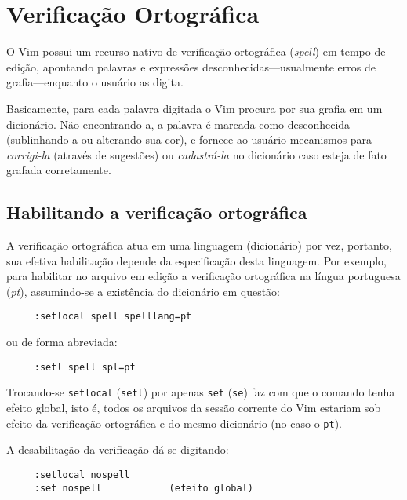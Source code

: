 
\chapter{Verificação Ortográfica}
\label{cha:vero}


O Vim possui um recurso nativo de verificação ortográfica ({\em spell}) em
tempo de edição, apontando palavras e expressões desconhecidas---usualmente
erros de grafia---enquanto o usuário as digita. 

Basicamente, para cada palavra digitada o Vim procura por sua grafia em um
dicionário. Não encontrando-a, a palavra é marcada como desconhecida
(sublinhando-a ou alterando sua cor), e fornece ao usuário mecanismos para
{\em corrigi-la} (através de sugestões) ou {\em cadastrá-la} no dicionário
caso esteja de fato grafada corretamente.

\section{Habilitando a verificação ortográfica}

A verificação ortográfica atua em uma linguagem (dicionário) por vez,
portanto, sua efetiva habilitação depende da especificação desta linguagem.
Por exemplo, para habilitar no arquivo em edição a verificação ortográfica na
língua portuguesa ({\em pt}), assumindo-se a existência do dicionário em
questão:

\begin{verbatim}
     :setlocal spell spelllang=pt
\end{verbatim}

ou de forma abreviada:

\begin{verbatim}
     :setl spell spl=pt
\end{verbatim}


Trocando-se {\tt setlocal} ({\tt setl}) por apenas {\tt set} ({\tt se}) faz
com que o comando tenha efeito global, isto é, todos os arquivos da sessão
corrente do Vim estariam sob efeito da verificação ortográfica e do mesmo
dicionário (no caso o {\tt pt}).

A desabilitação da verificação dá-se digitando:

\begin{verbatim}
     :setlocal nospell
     :set nospell            (efeito global)
\end{verbatim}

